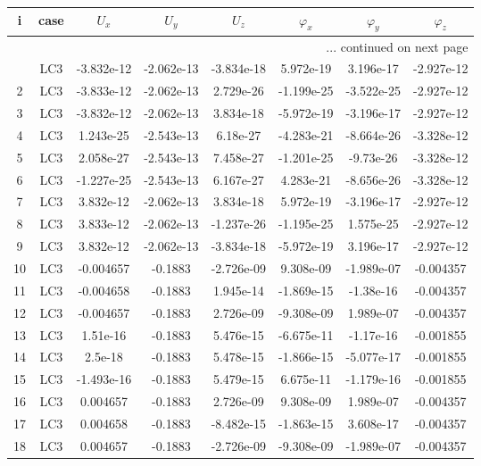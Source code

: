 \documentclass{article}%
\begin{document}
\begin{longtable}{| c c | c c c c c c |}%
\hline%
i&case&$U_x$&$U_y$&$U_z$&$\varphi_x$&$\varphi_y$&$\varphi_z$\\%
\hline%
\endhead%
\hline%
\multicolumn{8}{r}{... continued on next page}\\%
\endfoot%
\hline%
\endlastfoot%
1&LC3&{-}3.832e{-}12&{-}2.062e{-}13&{-}3.834e{-}18&5.972e{-}19&3.196e{-}17&{-}2.927e{-}12\\%
2&LC3&{-}3.833e{-}12&{-}2.062e{-}13&2.729e{-}26&{-}1.199e{-}25&{-}3.522e{-}25&{-}2.927e{-}12\\%
3&LC3&{-}3.832e{-}12&{-}2.062e{-}13&3.834e{-}18&{-}5.972e{-}19&{-}3.196e{-}17&{-}2.927e{-}12\\%
4&LC3&1.243e{-}25&{-}2.543e{-}13&6.18e{-}27&{-}4.283e{-}21&{-}8.664e{-}26&{-}3.328e{-}12\\%
5&LC3&2.058e{-}27&{-}2.543e{-}13&7.458e{-}27&{-}1.201e{-}25&{-}9.73e{-}26&{-}3.328e{-}12\\%
6&LC3&{-}1.227e{-}25&{-}2.543e{-}13&6.167e{-}27&4.283e{-}21&{-}8.656e{-}26&{-}3.328e{-}12\\%
7&LC3&3.832e{-}12&{-}2.062e{-}13&3.834e{-}18&5.972e{-}19&{-}3.196e{-}17&{-}2.927e{-}12\\%
8&LC3&3.833e{-}12&{-}2.062e{-}13&{-}1.237e{-}26&{-}1.195e{-}25&1.575e{-}25&{-}2.927e{-}12\\%
9&LC3&3.832e{-}12&{-}2.062e{-}13&{-}3.834e{-}18&{-}5.972e{-}19&3.196e{-}17&{-}2.927e{-}12\\%
10&LC3&{-}0.004657&{-}0.1883&{-}2.726e{-}09&9.308e{-}09&{-}1.989e{-}07&{-}0.004357\\%
11&LC3&{-}0.004658&{-}0.1883&1.945e{-}14&{-}1.869e{-}15&{-}1.38e{-}16&{-}0.004357\\%
12&LC3&{-}0.004657&{-}0.1883&2.726e{-}09&{-}9.308e{-}09&1.989e{-}07&{-}0.004357\\%
13&LC3&1.51e{-}16&{-}0.1883&5.476e{-}15&{-}6.675e{-}11&{-}1.17e{-}16&{-}0.001855\\%
14&LC3&2.5e{-}18&{-}0.1883&5.478e{-}15&{-}1.866e{-}15&{-}5.077e{-}17&{-}0.001855\\%
15&LC3&{-}1.493e{-}16&{-}0.1883&5.479e{-}15&6.675e{-}11&{-}1.179e{-}16&{-}0.001855\\%
16&LC3&0.004657&{-}0.1883&2.726e{-}09&9.308e{-}09&1.989e{-}07&{-}0.004357\\%
17&LC3&0.004658&{-}0.1883&{-}8.482e{-}15&{-}1.863e{-}15&3.608e{-}17&{-}0.004357\\%
18&LC3&0.004657&{-}0.1883&{-}2.726e{-}09&{-}9.308e{-}09&{-}1.989e{-}07&{-}0.004357\\%

\end{longtable}
\end{document}
